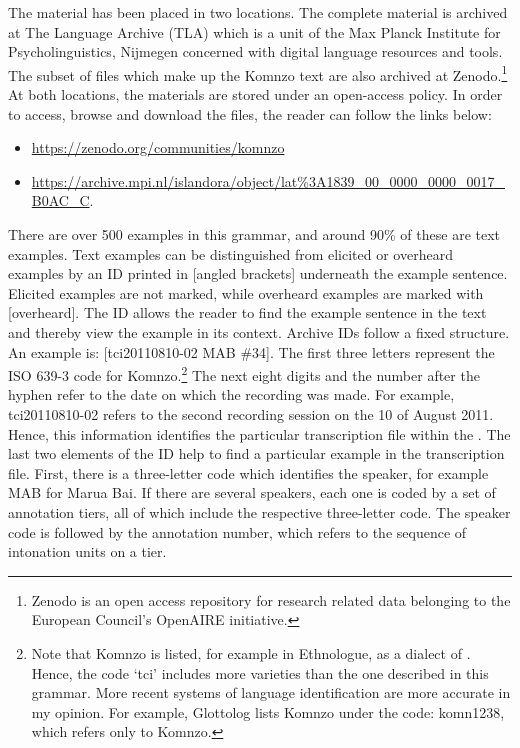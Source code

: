 The material has been placed in two locations. The complete material is archived at The Language Archive (TLA) which is a unit of the Max Planck Institute for Psycholinguistics, Nijmegen concerned with digital language resources and tools. The subset of files which make up the Komnzo text  are also archived at Zenodo.\footnote{Zenodo is an open access repository for research related data belonging to the European Council's OpenAIRE initiative.} At both locations, the materials are stored under an open-access policy. In order to access, browse and download the files, the reader can follow the links below:

\begin{itemize}
	\item \url{https://zenodo.org/communities/komnzo}
	\item \url{https://archive.mpi.nl/islandora/object/lat\%3A1839_00_0000_0000_0017_B0AC_C}.
\end{itemize}%

\newpage 
There are over 500 examples in this grammar, and around 90\% of these are text examples. Text examples can be distinguished from elicited or overheard examples by an  ID printed in [angled brackets] underneath the example sentence. Elicited examples are not marked, while overheard examples are marked with [overheard]. The  ID allows the reader to find the example sentence in the text  and thereby view the example in its context. Archive IDs follow a fixed structure. An example is: [tci20110810-02 MAB \#34]. The first three letters represent the ISO 639-3 code for Komnzo.\footnote{Note that Komnzo is listed, for example in Ethnologue, as a dialect of . Hence, the code `tci' includes more varieties than the one described in this grammar. More recent systems of language identification are more accurate in my opinion. For example, Glottolog lists Komnzo under the code: komn1238, which refers only to Komnzo.} The next eight digits and the number after the hyphen refer to the date on which the recording was made. For example, tci20110810-02 refers to the second recording session on the 10 of August 2011.  Hence, this information identifies the particular transcription file within the . The last two elements of the  ID help to find a particular example in the transcription file. First, there is a three-letter code which identifies the speaker, for example MAB for Marua Bai. If there are several speakers, each one is coded by a set of annotation tiers, all of which include the respective three-letter code. The speaker code is followed by the annotation number, which refers to the sequence of intonation units on a tier.

